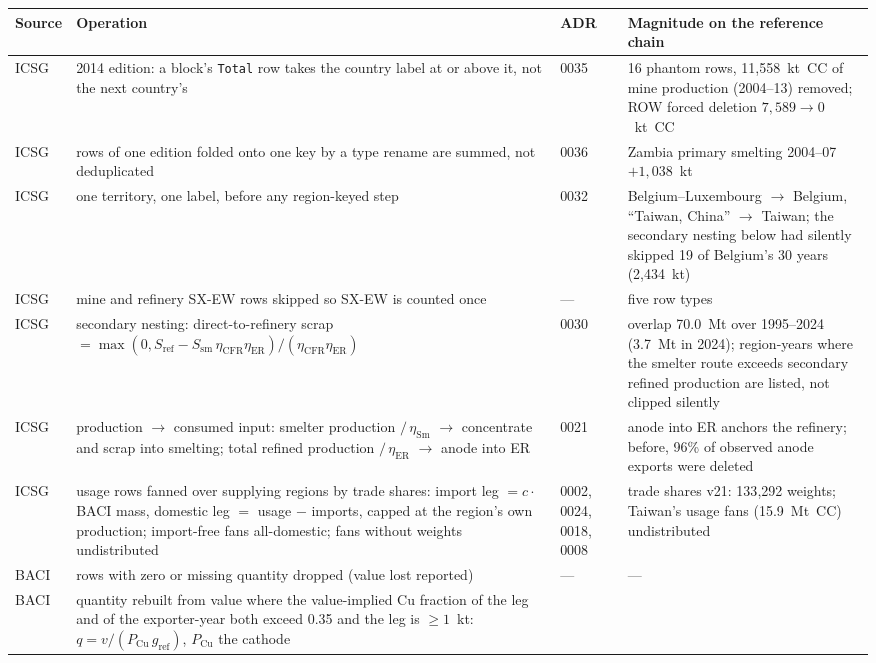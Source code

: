 \documentclass[11pt]{article}
\begin{document}
\begin{table}[h]
\centering\footnotesize
\begin{tabular}{@{}p{1.3cm}p{5.4cm}p{1.1cm}p{6.4cm}@{}}
\toprule
Source & Operation & ADR & Magnitude on the reference chain \\
\midrule
ICSG & 2014 edition: a block's \texttt{Total} row takes the country label at
or above it, not the next country's & 0035 & 16 phantom rows, 11{,}558~kt~CC
of mine production (2004--13) removed; ROW forced deletion $7{,}589 \to 0$~kt~CC \\
ICSG & rows of one edition folded onto one key by a type rename are summed,
not deduplicated & 0036 & Zambia primary smelting 2004--07 $+1{,}038$~kt \\
ICSG & one territory, one label, before any region-keyed step & 0032 &
Belgium--Luxembourg $\to$ Belgium, ``Taiwan, China'' $\to$ Taiwan; the
secondary nesting below had silently skipped 19 of Belgium's 30 years
(2{,}434~kt) \\
ICSG & mine and refinery SX-EW rows skipped so SX-EW is counted once &
--- & five row types \\
ICSG & secondary nesting: direct-to-refinery scrap $= \max(0, S_{\mathrm{ref}}
- S_{\mathrm{sm}}\,\eta_{\mathrm{CFR}}\eta_{\mathrm{ER}}) /
(\eta_{\mathrm{CFR}}\eta_{\mathrm{ER}})$ & 0030 & overlap 70.0~Mt over
1995--2024 (3.7~Mt in 2024); region-years where the smelter route exceeds
secondary refined production are listed, not clipped silently \\
ICSG & production $\to$ consumed input: smelter production $/\,\eta_{\mathrm{Sm}}$
$\to$ concentrate and scrap into smelting; total refined production
$/\,\eta_{\mathrm{ER}}$ $\to$ anode into ER & 0021 & anode into ER anchors
the refinery; before, 96\% of observed anode exports were deleted \\
ICSG & usage rows fanned over supplying regions by trade shares: import leg
$= c \cdot$ BACI mass, domestic leg $=$ usage $-$ imports, capped at the
region's own production; import-free fans all-domestic; fans without weights
undistributed & 0002, 0024, 0018, 0008 & trade shares v21: 133{,}292
weights; Taiwan's usage fans (15.9~Mt~CC) undistributed \\
BACI & rows with zero or missing quantity dropped (value lost reported) & --- & --- \\
BACI & quantity rebuilt from value where the value-implied Cu fraction of the
leg and of the exporter-year both exceed 0.35 and the leg is $\ge 1$~kt:
$q = v/(P_{\mathrm{Cu}}\, g_{\mathrm{ref}})$, $P_{\mathrm{Cu}}$ the cathode

\end{tabular}
\end{table}
\end{document}

